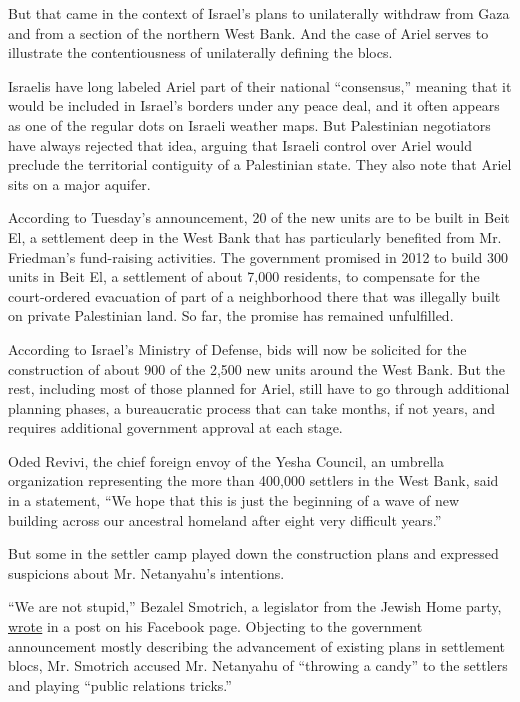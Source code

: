 But that came in the context of Israel's plans to unilaterally withdraw
from Gaza and from a section of the northern West Bank. And the case of
Ariel serves to illustrate the contentiousness of unilaterally defining
the blocs.

Israelis have long labeled Ariel part of their national ``consensus,''
meaning that it would be included in Israel's borders under any peace
deal, and it often appears as one of the regular dots on Israeli weather
maps. But Palestinian negotiators have always rejected that idea,
arguing that Israeli control over Ariel would preclude the territorial
contiguity of a Palestinian state. They also note that Ariel sits on a
major aquifer.

According to Tuesday's announcement, 20 of the new units are to be built
in Beit El, a settlement deep in the West Bank that has particularly
benefited from Mr. Friedman's fund-raising activities. The government
promised in 2012 to build 300 units in Beit El, a settlement of about
7,000 residents, to compensate for the court-ordered evacuation of part
of a neighborhood there that was illegally built on private Palestinian
land. So far, the promise has remained unfulfilled.

According to Israel's Ministry of Defense, bids will now be solicited
for the construction of about 900 of the 2,500 new units around the West
Bank. But the rest, including most of those planned for Ariel, still
have to go through additional planning phases, a bureaucratic process
that can take months, if not years, and requires additional government
approval at each stage.

Oded Revivi, the chief foreign envoy of the Yesha Council, an umbrella
organization representing the more than 400,000 settlers in the West
Bank, said in a statement, ``We hope that this is just the beginning of
a wave of new building across our ancestral homeland after eight very
difficult years.''

But some in the settler camp played down the construction plans and
expressed suspicions about Mr. Netanyahu's intentions.

``We are not stupid,'' Bezalel Smotrich, a legislator from the Jewish
Home party, \href{https://www.facebook.com/Bezazelsmotrich/}{wrote} in a
post on his Facebook page. Objecting to the government announcement
mostly describing the advancement of existing plans in settlement blocs,
Mr. Smotrich accused Mr. Netanyahu of ``throwing a candy'' to the
settlers and playing ``public relations tricks.''

